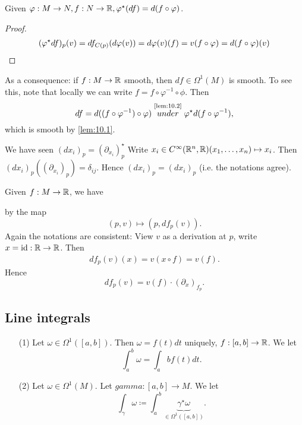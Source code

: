 \begin{lemma}\label{lem:10.2}
    Given \(\varphi:M\to N,f:N\to \mathbb{R},\varphi^\star(df)=d(f\circ \varphi)\).
\end{lemma}

\begin{proof}
    \begin{align*}
        (\varphi^\star df)_p(v)=df_{C(p)}(d\varphi(v))=d\varphi(v)(f)=v(f\circ \varphi)=d(f\circ \varphi)(v) \qedhere
    \end{align*}
\end{proof}
 
As a consequence: if \(f:M\to \mathbb{R}\) smooth, then \(df\in \Omega^1(M)\) is smooth. To see this, note that 
locally we can write \(f=f\circ \varphi^{-1}\circ \phi\). Then \[df=d((f\circ \varphi^{-1})\circ \varphi)\stackrel{\text{\ref{lem:10.2}}}{under}\varphi^\star d(f\circ \varphi^{-1}),\]
which is smooth by \ref{lem:10.1}.

\begin{remark}
    We have seen \((dx_i)_p=(\partial_{x_i})_p^\star\)
    Write \(x_i\in C^\infty(\mathbb{R}^n,\mathbb{R})(x_1,\dots,x_n)\mapsto x_i\).
    Then \((dx_i)_p((\partial_{x_i})_p)=\delta_{ij}\). Hence \((dx_i)_p=(dx_i)_p\) (i.e. the notations agree). 
\end{remark}

\begin{remark}
    Given \(f:M\to \mathbb{R}\), we have 
    by the map \[(p,v)\mapsto (p,df_p(v)).\]
    Again the notations are consistent: View \(v\) as a derivation at \(p\),
    write \(x=\text{id}:\mathbb{R}\to\mathbb{R}\). Then 
    \begin{align*}
        df_p(v)(x)=v(x\circ f)=v(f).
    \end{align*}
    Hence \[df_p(v)=v(f)\cdot (\partial_x)_{f_p}.\] %
\end{remark}

\subsection{Line integrals}

\begin{definition*}
    \begin{enumerate}
        \item[(1)] Let \(\omega\in \Omega^1([a,b])\). Then \(\omega=f(t)dt\) uniquely, \(f:[a,b]\to\mathbb{R}\).
                   We let \[\int_a^b\omega=\int_a b f(t)dt.\] 
        \item[(2)] Let \(\omega\in \Omega^1(M)\). Let \(gamma:[a,b]\to M\). We let \[\int_\gamma \omega\coloneqq \int_a^b\underbrace{\gamma^\star \omega}_{\in\Omega^1([a,b])}.\]
    \end{enumerate}
\end{definition*}

